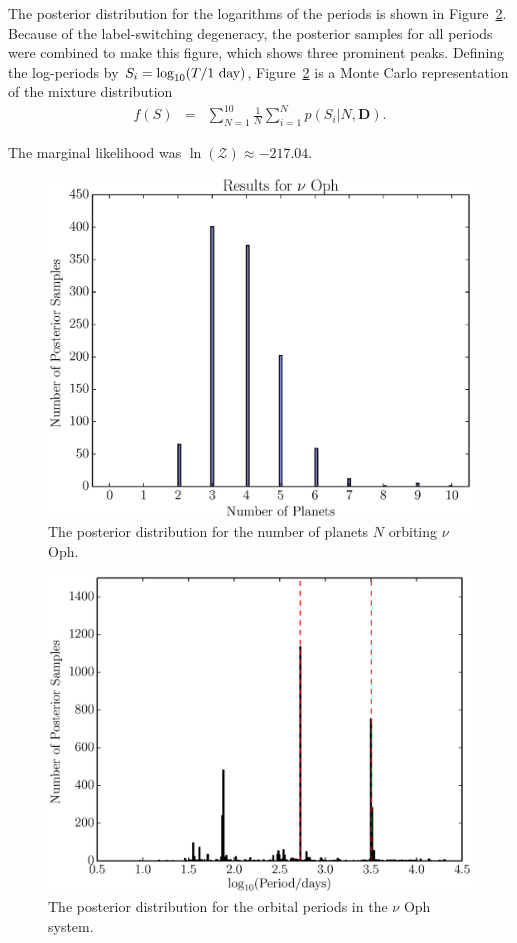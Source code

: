 \documentclass[useAMS,usenatbib]{mn2e}
\newcommand{\bdata}{\boldsymbol{D}}
\begin{document}
The posterior distribution for the logarithms of the periods is shown in
Figure~\ref{fig:nu_oph_periods}. Because of the label-switching degeneracy,
the posterior samples for all periods were combined to make this figure, which
shows three prominent peaks. Defining the log-periods by
$S_i =  \log_{10}(T/\textnormal{1 day})$,
Figure~\ref{fig:nu_oph_periods} is a Monte Carlo representation
of the mixture distribution
\begin{eqnarray}
f(S) &=& \sum_{N=1}^{10} \frac{1}{N}\sum_{i=1}^N p(S_i | N, \bdata).
\end{eqnarray}

The marginal likelihood was $\ln(\mathcal{Z}) \approx -217.04$.


\begin{figure}
\includegraphics[scale=0.5]{Figures/nu_oph_N.eps}
\caption{The posterior distribution for the number of planets $N$ orbiting
$\nu$ Oph.\label{fig:nu_oph_N}}
\end{figure}

\begin{figure}
\includegraphics[scale=0.5]{Figures/nu_oph_periods.eps}
\caption{The posterior distribution for the orbital periods in the $\nu$ Oph
system.\label{fig:nu_oph_periods}}
\end{figure}
\end{document}
